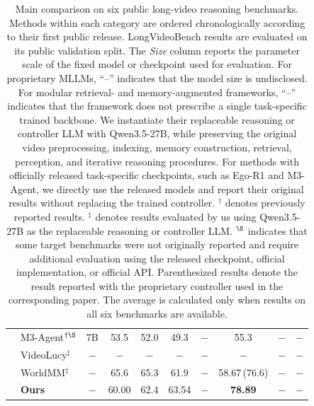 \documentclass[letterpaper]{article} %
\begin{document}
\begin{table}[t]
{\begin{tabular}{llcccccccc}
& M3-Agent$^{\dagger\S}$
& 7B
& 53.5 & 52.0 & 49.3 & $-$ & 55.3 & $-$ & $-$ \\

& VideoLucy$^{\ddagger}$
& $-$
& $-$ & $-$ & $-$ & $-$ & $-$ & $-$ & $-$ \\

& WorldMM$^{\ddagger}$
& $-$
& 65.6 & 65.3 & 61.9 & $-$
& 58.67\,(76.6) & $-$ & $-$ \\

\midrule

& \textbf{Ours}
& $-$ & 60.00 & 62.4& 63.54 & $-$ & \textbf{78.89} & $-$ & $-$ \\


\bottomrule
\end{tabular}%
}
\caption{
Main comparison on six public long-video reasoning benchmarks.
Methods within each category are ordered chronologically according to their
first public release.
LongVideoBench results are evaluated on its public validation split.
The \emph{Size} column reports the parameter scale of the fixed model or
checkpoint used for evaluation.
For proprietary MLLMs, ``--'' indicates that the model size is undisclosed.
For modular retrieval- and memory-augmented frameworks, ``--'' indicates that
the framework does not prescribe a single task-specific trained backbone.
We instantiate their replaceable reasoning or controller LLM with Qwen3.5-27B,
while preserving the original video preprocessing, indexing, memory
construction, retrieval, perception, and iterative reasoning procedures.
For methods with officially released task-specific checkpoints, such as
Ego-R1 and M3-Agent, we directly use the released models and report their
original results without replacing the trained controller.
$^{\dagger}$ denotes previously reported results.
$^{\ddagger}$ denotes results evaluated by us using Qwen3.5-27B as the
replaceable reasoning or controller LLM.
$^{\S}$ indicates that some target benchmarks were not originally reported
and require additional evaluation using the released checkpoint, official
implementation, or official API.
Parenthesized results denote the result reported with the proprietary
controller used in the corresponding paper.
The average is calculated only when results on all six benchmarks are available.
}
\label{tab:main_results}
\end{table}
\end{document}
